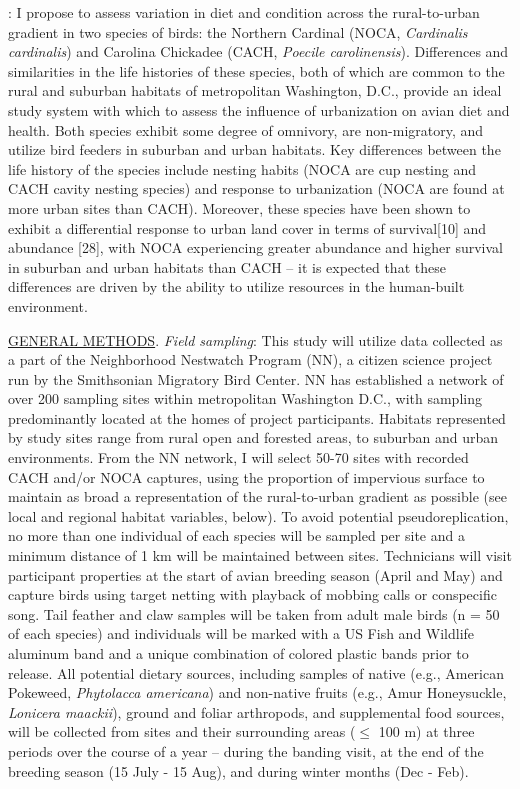 \documentclass[12pt]{article}
\begin{document}

: I propose to assess variation in diet and condition across the rural-to-urban gradient in two species of birds: the Northern Cardinal (NOCA, \textit{Cardinalis cardinalis}) and Carolina Chickadee (CACH, \textit{Poecile carolinensis}). Differences and similarities in the life histories of these species, both of which are common to the rural and suburban habitats of metropolitan Washington, D.C., provide an ideal study system with which to assess the influence of urbanization on avian diet and health. Both species exhibit some degree of omnivory, are non-migratory, and utilize bird feeders in suburban and urban habitats. Key differences between the life history of the species include nesting habits (NOCA are cup nesting and CACH cavity nesting species) and response to urbanization (NOCA are found at more urban sites than CACH). Moreover, these species have been shown to exhibit a differential response to urban land cover in terms of survival[10] and abundance [28], with NOCA experiencing greater abundance and higher survival in suburban and urban habitats than CACH -- it is expected that these differences are driven by the ability to utilize resources in the human-built environment.


\noindent \underline{GENERAL METHODS}. \textit {Field sampling}: This study will utilize data collected as a part of the Neighborhood Nestwatch Program (NN), a citizen science project run by the Smithsonian Migratory Bird Center. NN has established a network of over 200 sampling sites within metropolitan Washington D.C., with sampling predominantly located at the homes of project participants. Habitats represented by study sites range from rural open and forested areas, to suburban and urban environments. From the NN network, I will select 50-70 sites with recorded CACH and/or NOCA captures, using the proportion of impervious surface to maintain as broad a representation of the rural-to-urban gradient as possible (see local and regional habitat variables, below). To avoid potential pseudoreplication, no more than one individual of each species will be sampled per site and a minimum distance of 1 km will be maintained between sites. Technicians will visit participant properties at the start of avian breeding season (April and May) and capture birds using target netting with playback of mobbing calls or conspecific song. Tail feather and claw samples will be taken from adult male birds (n = 50 of each species) and individuals will be marked with a US Fish and Wildlife aluminum band and a unique combination of colored plastic bands prior to release. All potential dietary sources, including samples of native  (e.g., American  Pokeweed, \textit {Phytolacca americana}) and non-native fruits (e.g., Amur Honeysuckle, \textit {Lonicera maackii}), ground and foliar arthropods, and supplemental food sources, will be collected from sites and their surrounding areas ($\leq$ 100 m) at three periods over the course of a year -- during the banding visit, at the end of the breeding season (15 July - 15 Aug), and during winter months (Dec - Feb).\par
\end{document}
